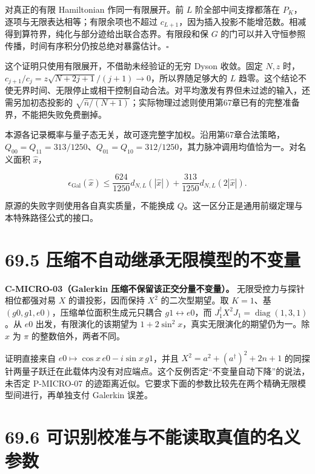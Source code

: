\documentclass[
  11pt,
  oneside]{book}
\begin{document}
对真正的有限 Hamiltonian 作同一有限展开。前 \(L\) 阶全部中间支撑都落在
\(P_K\)，逐项与无限表达相等；有限余项也不超过
\(c_{L+1}\)，因为插入投影不能增范数。相减得到算符界，纯化与部分迹给出联合态界。有限段和保
\(G\)
的门可以并入守恒参照传播，时间有序积分仍按总绝对暴露估计。\(\square\)

这个证明只使用有限展开，不借助未经验证的无穷 Dyson 收敛。固定 \(N,z\)
时，\(c_{j+1}/c_j=z\sqrt{N+2j+1}/(j+1)\to0\)，所以界随足够大的 \(L\)
趋零。这个结论不使无界时间、无限停止或相干控制自动合法。对平均激发有界但未过滤的输入，还需另加初态投影的
\(\sqrt{\bar n/(N+1)}\)；实际物理过滤则使用第67章已有的完整准备界，不能把失败免费删掉。

本源各记录概率与量子态无关，故可逐完整字加权。沿用第67章合法策略，\(Q_{00}=Q_{11}=313/1250\)、\(Q_{01}=Q_{10}=312/1250\)，其力脉冲调用均值恰为一。对名义面积
\(\widehat x\)，

\[
\epsilon_{\mathrm{Gal}}(\widehat x)
\le\frac{624}{1250}d_{N,L}(|\widehat x|)
 +\frac{313}{1250}d_{N,L}(2|\widehat x|).
\]

原源的失败字则使用各自真实质量，不能换成
\(Q\)。这一区分正是通用前缀定理与本特殊路径公式的接口。

\section{69.5 压缩不自动继承无限模型的不变量}

\protect\hypertarget{c-micro-03}{}{}

\textbf{C-MICRO-03（Galerkin 压缩不保留该正交分量不变量）。}
无限受控力与探针相位都强对易 \(X\) 的谱投影，因而保持 \(X^2\)
的二次型期望。取 \(K=1\)、基 \((g0,g1,e0)\)，压缩单位面积生成元只耦合
\(g1\leftrightarrow e0\)，而
\(J_1^\dagger X^2J_1=\operatorname{diag}(1,3,1)\)。从 \(e0\)
出发，有限演化的该期望为 \(1+2\sin^2x\)，真实无限演化的期望仍为一。除
\(x\) 为 \(\pi\) 的整数倍外，两者不同。

证明直接来自 \(e0\mapsto\cos x\,e0-i\sin x\,g1\)，并且
\(X^2=a^2+(a^\dagger)^2+2n+1\)
的同探针两量子跃迁在此载体内没有对应端点。这个反例否定``不变量自动下降''的说法，未否定
P-MICRO-07
的迹距离近似。它要求下面的参数比较先在两个精确无限模型间进行，再单独支付
Galerkin 误差。

\section{69.6 可识别校准与不能读取真值的名义参数}

\protect\hypertarget{p-rob-04}{}{}
\end{document}

